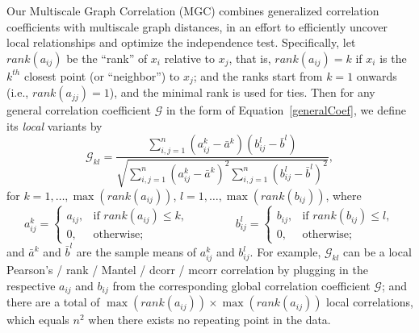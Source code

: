 \documentclass[11pt]{article}
\newcommand{\G}{\mathcal{G}}
\begin{document}
Our Multiscale Graph Correlation (MGC) combines generalized correlation coefficients with multiscale graph distances, in an effort to efficiently uncover local relationships and optimize the independence test.  Specifically, let $rank(a_{ij})$  be the ``rank'' of $x_i$ relative to $x_j$, that is, $rank(a_{ij})=k$ if $x_i$ is the $k^{th}$ closest point (or ``neighbor'') to $x_j$; and the ranks start from $k=1$ onwards (i.e., $rank(a_{jj})=1$), and the minimal rank is used for ties.  Then for any general correlation coefficient $\G$ in the form of Equation~\ref{generalCoef}, we define its \emph{local} variants by
\begin{equation}
\label{localCoef}
\G_{kl}=\frac{\sum_{i,j=1}^n (a_{ij}^k-\bar{a}^{k}) (b_{ij}^l-\bar{b}^{l})}{\sqrt{\sum_{i,j=1}^n  (a_{ij}^{k}-\bar{a}^{k})^2 \sum_{i,j=1}^n (b_{ij}^{l}-\bar{b}^{l})^2}},
\end{equation}
for $k=1,\ldots,\max(rank(a_{ij}))$, $l=1,\ldots,\max(rank(b_{ij}))$, where
\begin{equation}
\label{localCoef2}
    a_{ij}^k=
    \begin{cases}
      a_{ij}, & \text{if } rank(a_{ij}) \leq k, \\
      0, & \text{otherwise};
    \end{cases} \qquad \qquad
    b_{ij}^l=
    \begin{cases}
      b_{ij}, & \text{if } rank(b_{ij}) \leq l, \\
      0, & \text{otherwise};
    \end{cases}
\end{equation}
and $\bar{a}^{k}$ and $\bar{b}^{l}$ are the sample means of $a_{ij}^{k}$ and $b_{ij}^{l}$. For example, $\G_{kl}$ can be a local Pearson's / rank / Mantel / dcorr / mcorr correlation by plugging in the respective $a_{ij}$ and $b_{ij}$ from the corresponding global correlation coefficient $\G$; and there are a total of $\max(rank(a_{ij})) \times \max(rank(a_{ij}))$ local correlations, which equals $n^2$ when there exists no repeating point in the data.

\end{document}
